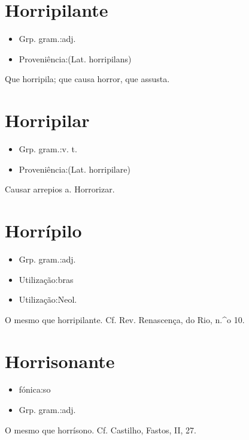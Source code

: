 \documentclass{article}
\begin{document}
\section{Horripilante}
\begin{itemize}
\item {Grp. gram.:adj.}
\end{itemize}
\begin{itemize}
\item {Proveniência:(Lat. \textunderscore horripilans\textunderscore )}
\end{itemize}
Que horripila; que causa horror, que assusta.
\section{Horripilar}
\begin{itemize}
\item {Grp. gram.:v. t.}
\end{itemize}
\begin{itemize}
\item {Proveniência:(Lat. \textunderscore horripilare\textunderscore )}
\end{itemize}
Causar arrepios a.
Horrorizar.
\section{Horrípilo}
\begin{itemize}
\item {Grp. gram.:adj.}
\end{itemize}
\begin{itemize}
\item {Utilização:bras}
\end{itemize}
\begin{itemize}
\item {Utilização:Neol.}
\end{itemize}
O mesmo que \textunderscore horripilante\textunderscore . Cf. Rev. \textunderscore Renascença\textunderscore , do Rio, n.^o 10.
\section{Horrisonante}
\begin{itemize}
\item {fónica:so}
\end{itemize}
\begin{itemize}
\item {Grp. gram.:adj.}
\end{itemize}
O mesmo que \textunderscore horrísono\textunderscore . Cf. Castilho, \textunderscore Fastos\textunderscore , II, 27.
\end{document}
